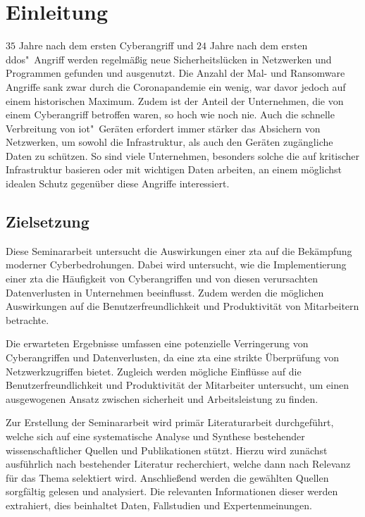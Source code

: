 \section{Einleitung}\label{sec:einleitung}

$35$ Jahre nach dem ersten Cyberangriff und $24$ Jahre nach dem ersten \ac{ddos}"~Angriff werden regelmäßig neue Sicherheitslücken in Netzwerken und Programmen gefunden und ausgenutzt.
Die Anzahl der Mal- und Ransomware Angriffe sank zwar durch die Coronapandemie ein wenig, war davor jedoch auf einem historischen Maximum.
Zudem ist der Anteil der Unternehmen, die von einem Cyberangriff betroffen waren, so hoch wie noch nie.
Auch die schnelle Verbreitung von \ac{iot}"~Geräten erfordert immer stärker das Absichern von Netzwerken, um sowohl die Infrastruktur, als auch den Geräten zugängliche Daten zu schützen.
So sind viele Unternehmen, besonders solche die auf kritischer Infrastruktur basieren oder mit wichtigen Daten arbeiten, an einem möglichst idealen Schutz gegenüber diese Angriffe interessiert.

\subsection{Zielsetzung}\label{subsec:zielsetzung}
Diese Seminararbeit untersucht die Auswirkungen einer \ac{zta} auf die Bekämpfung moderner Cyberbedrohungen.
Dabei wird untersucht, wie die Implementierung einer \ac{zta} die Häufigkeit von Cyberangriffen und von diesen verursachten Datenverlusten in Unternehmen beeinflusst.
Zudem werden die möglichen Auswirkungen auf die Benutzerfreundlichkeit und Produktivität von Mitarbeitern betrachte.

Die erwarteten Ergebnisse umfassen eine potenzielle Verringerung von Cyberangriffen und Datenverlusten, da eine \ac{zta} eine strikte Überprüfung von Netzwerkzugriffen bietet.
Zugleich werden mögliche Einflüsse auf die Benutzerfreundlichkeit und Produktivität der Mitarbeiter untersucht, um einen ausgewogenen Ansatz zwischen sicherheit und Arbeitsleistung zu finden.

Zur Erstellung der Seminararbeit wird primär Literaturarbeit durchgeführt, welche sich auf eine systematische Analyse und Synthese bestehender wissenschaftlicher Quellen und Publikationen stützt.
Hierzu wird zunächst ausführlich nach bestehender Literatur recherchiert, welche dann nach Relevanz für das Thema selektiert wird.
Anschließend werden die gewählten Quellen sorgfältig gelesen und analysiert.
Die relevanten Informationen dieser werden extrahiert, dies beinhaltet Daten, Fallstudien und Expertenmeinungen.

